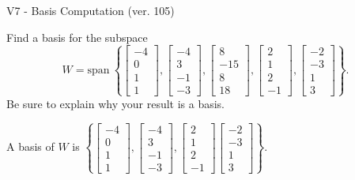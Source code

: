 \begin{exercise}
  \begin{exerciseTitle}V7 - Basis Computation (ver. 105)\end{exerciseTitle}
  \begin{exerciseStatement}
    Find a basis for the subspace 
\[W=\mathrm{span}\ \left\{\left[\begin{array}{r}
-4 \\
0 \\
1 \\
1
\end{array}\right] , \left[\begin{array}{r}
-4 \\
3 \\
-1 \\
-3
\end{array}\right] , \left[\begin{array}{r}
8 \\
-15 \\
8 \\
18
\end{array}\right] , \left[\begin{array}{r}
2 \\
1 \\
2 \\
-1
\end{array}\right] , \left[\begin{array}{r}
-2 \\
-3 \\
1 \\
3
\end{array}\right]\right\}.\]
 Be sure to explain why your result is a basis.


  \end{exerciseStatement}
  \begin{exerciseAnswer}
   A basis of \(W\) is  \(\left\{\left[\begin{array}{r}
-4 \\
0 \\
1 \\
1
\end{array}\right] , \left[\begin{array}{r}
-4 \\
3 \\
-1 \\
-3
\end{array}\right] , \left[\begin{array}{r}
2 \\
1 \\
2 \\
-1
\end{array}\right] \left[\begin{array}{r}
-2 \\
-3 \\
1 \\
3
\end{array}\right]\right\}\).
  


  \end{exerciseAnswer}
\end{exercise}